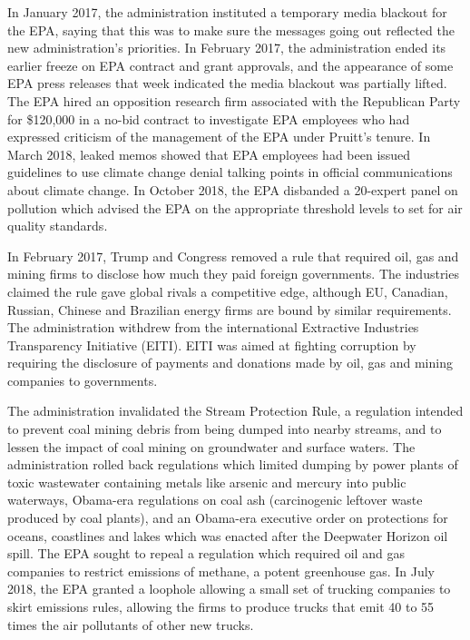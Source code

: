 In January 2017, the administration instituted a temporary media
blackout for the EPA, saying that this was to make sure the messages
going out reflected the new administration's priorities. In February
2017, the administration ended its earlier freeze on EPA contract and
grant approvals, and the appearance of some EPA press releases that week
indicated the media blackout was partially lifted. The EPA hired an
opposition research firm associated with the Republican Party for
\$120,000 in a no-bid contract to investigate EPA employees who had
expressed criticism of the management of the EPA under Pruitt's tenure.
In March 2018, leaked memos showed that EPA employees had been issued
guidelines to use climate change denial talking points in official
communications about climate change. In October 2018, the EPA disbanded
a 20-expert panel on pollution which advised the EPA on the appropriate
threshold levels to set for air quality standards.

In February 2017, Trump and Congress removed a rule that required oil,
gas and mining firms to disclose how much they paid foreign governments.
The industries claimed the rule gave global rivals a competitive edge,
although EU, Canadian, Russian, Chinese and Brazilian energy firms are
bound by similar requirements. The administration withdrew from the
international Extractive Industries Transparency Initiative (EITI). EITI
was aimed at fighting corruption by requiring the disclosure of payments
and donations made by oil, gas and mining companies to governments.

The administration invalidated the Stream Protection Rule, a regulation
intended to prevent coal mining debris from being dumped into nearby
streams, and to lessen the impact of coal mining on groundwater and
surface waters. The administration rolled back regulations which limited
dumping by power plants of toxic wastewater containing metals like
arsenic and mercury into public waterways, Obama-era regulations on coal
ash (carcinogenic leftover waste produced by coal plants), and an
Obama-era executive order on protections for oceans, coastlines and
lakes which was enacted after the Deepwater Horizon oil spill. The EPA
sought to repeal a regulation which required oil and gas companies to
restrict emissions of methane, a potent greenhouse gas. In July 2018,
the EPA granted a loophole allowing a small set of trucking companies to
skirt emissions rules, allowing the firms to produce trucks that emit 40
to 55 times the air pollutants of other new trucks.

